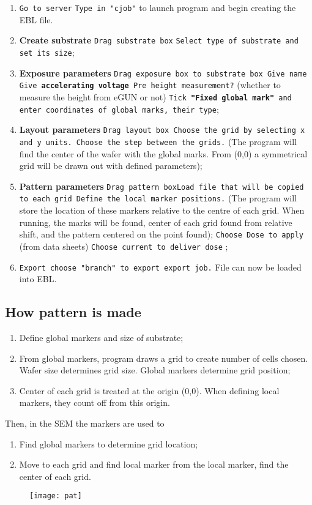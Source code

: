    \begin{enumerate}
   	\item \texttt{Go to server} \ira \texttt{Type in "cjob"} to launch program and begin creating the EBL file.
   	\item \textbf{Create substrate} \texttt{Drag substrate box} \ira \texttt{Select type of substrate and set its size};
   	\item \textbf{Exposure parameters} \texttt{Drag exposure box to substrate box \ira Give name \ira Give \textbf{accelerating voltage} \ira Pre height measurement?} (whether to measure the height from eGUN or not) \ira \texttt{Tick \textbf{"Fixed global mark"} and enter coordinates of global marks, their type};
   	\item \textbf{Layout parameters} \texttt{Drag layout box \ira Choose the grid by selecting x and y units. Choose the step between the grids.} (The program will find the center of the wafer with the global marks. From (0,0) a symmetrical grid will be drawn out with defined parameters);
   	\item \textbf{Pattern parameters} \texttt{Drag pattern box\ira Load file that will be copied to each grid \ira Define the local marker positions.} (The program will store the location of these markers relative to the centre of each grid. When running, the marks will be found, center of each grid found from relative shift, and the pattern centered on the point found); \ira \texttt{Choose Dose to apply} (from data sheets) \ira \texttt{Choose current to deliver dose} ;
   	\item \texttt{Export \ira choose "branch" to export \ira export job.} File can now be loaded into EBL.
   \end{enumerate}


 \subsection{How pattern is made}
  \begin{enumerate}
  	\item Define global markers and size of substrate;
  	\item From global markers, program draws a grid to create number of cells chosen. Wafer size determines grid size. Global markers determine grid position;
  	\item Center of each grid is treated at the origin (0,0). When defining local markers, they count off from this origin.
  \end{enumerate}

  Then, in the SEM the markers are used to
   \begin{enumerate}
   	\item Find global markers to determine grid location;
   	\item Move to each grid and find local marker \ira from the local marker, find the center of each grid.
   \end{enumerate}

  
  \begin{figure}[h]
	\centering
	\texttt{[image: pat]}
	\label{fig:pat}
  \end{figure}

\newpage